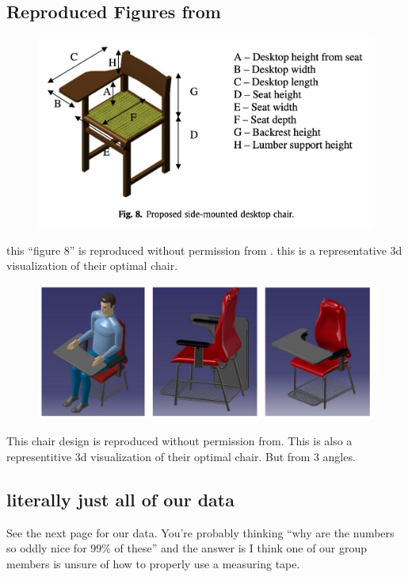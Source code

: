 \documentclass[conference]{IEEEtran}
\begin{document}
\pagebreak
\onecolumn

\subsection{Reproduced Figures from \cite{mohamed} \cite{Ansari}}

\begin{figure}[H]
    \centering
    \includegraphics[width=0.6\linewidth]{vis/mohamed_chair.png}
\end{figure}

this ``figure 8'' is reproduced without permission from \cite{mohamed}. this is a representative 3d visualization of their optimal chair.

\begin{figure}[H]
    \centering
    \includegraphics[width=0.6\linewidth]{vis/other_chair.png}
\end{figure}

This chair design is reproduced without permission from\cite{Ansari}. This is also a representitive 3d visualization of their optimal chair. But from 3 angles. 



\subsection{literally just all of our data}
See the next page for our data. You're probably thinking ``why are the numbers so oddly nice for 99\% of these'' and the answer is I think one of our group members is unsure of how to properly use a measuring tape.


\end{document}
